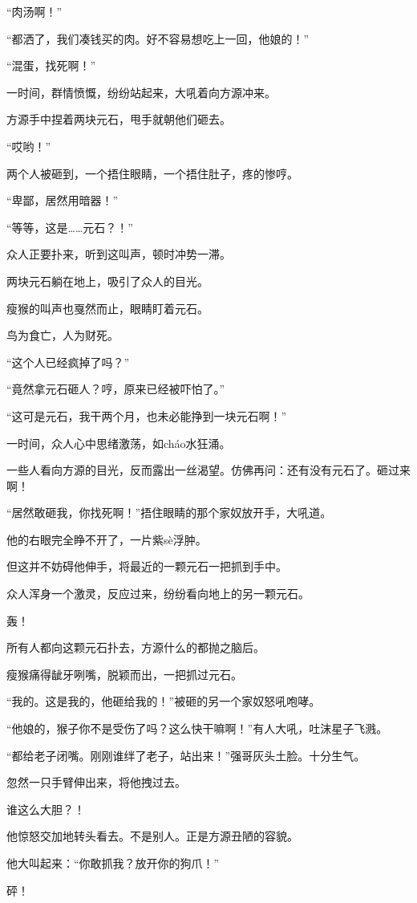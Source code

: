 \begin{this_body}
“肉汤啊！”

“都洒了，我们凑钱买的肉。好不容易想吃上一回，他娘的！”

“混蛋，找死啊！”

一时间，群情愤慨，纷纷站起来，大吼着向方源冲来。

方源手中捏着两块元石，甩手就朝他们砸去。

“哎哟！”

两个人被砸到，一个捂住眼睛，一个捂住肚子，疼的惨哼。

“卑鄙，居然用暗器！”

“等等，这是……元石？！”

众人正要扑来，听到这叫声，顿时冲势一滞。

两块元石躺在地上，吸引了众人的目光。

瘦猴的叫声也戛然而止，眼睛盯着元石。

鸟为食亡，人为财死。

“这个人已经疯掉了吗？”

“竟然拿元石砸人？哼，原来已经被吓怕了。”

“这可是元石，我干两个月，也未必能挣到一块元石啊！”

一时间，众人心中思绪激荡，如cháo水狂涌。

一些人看向方源的目光，反而露出一丝渴望。仿佛再问：还有没有元石了。砸过来啊！

“居然敢砸我，你找死啊！”捂住眼睛的那个家奴放开手，大吼道。

他的右眼完全睁不开了，一片紫sè浮肿。

但这并不妨碍他伸手，将最近的一颗元石一把抓到手中。

众人浑身一个激灵，反应过来，纷纷看向地上的另一颗元石。

轰！

所有人都向这颗元石扑去，方源什么的都抛之脑后。

瘦猴痛得龇牙咧嘴，脱颖而出，一把抓过元石。

“我的。这是我的，他砸给我的！”被砸的另一个家奴怒吼咆哮。

“他娘的，猴子你不是受伤了吗？这么快干嘛啊！”有人大吼，吐沫星子飞溅。

“都给老子闭嘴。刚刚谁绊了老子，站出来！”强哥灰头土脸。十分生气。

忽然一只手臂伸出来，将他拽过去。

谁这么大胆？！

他惊怒交加地转头看去。不是别人。正是方源丑陋的容貌。

他大叫起来：“你敢抓我？放开你的狗爪！”

砰！


\end{this_body}
